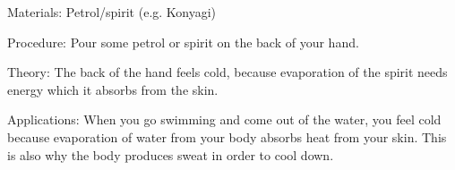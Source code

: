 \begin{multicols}{2}
\begin{description*}
\item[Materials:]{Petrol/spirit (e.g. Konyagi)}
\item[Procedure:]{Pour some petrol or spirit on the back of your hand.}
\item[Theory:]{The back of the hand feels cold, because evaporation of the spirit needs energy which it absorbs from the skin.}
\item[Applications:]{When you go swimming and come out of the water, you feel cold because evaporation of water from your body absorbs heat from your skin. This is also why the body produces sweat in order to cool down.}
\end{description*}




\end{multicols}

\vfill
\pagebreak